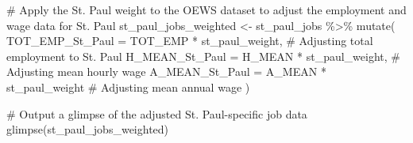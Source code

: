 \documentclass[
  letterpaper,
  DIV=11,
  numbers=noendperiod]{scrartcl}
\newenvironment{Shaded}{\begin{snugshade}}{\end{snugshade}}
\newcommand{\AttributeTok}[1]{\textcolor[rgb]{0.40,0.45,0.13}{#1}}
\newcommand{\CommentTok}[1]{\textcolor[rgb]{0.37,0.37,0.37}{#1}}
\newcommand{\FunctionTok}[1]{\textcolor[rgb]{0.28,0.35,0.67}{#1}}
\newcommand{\NormalTok}[1]{\textcolor[rgb]{0.00,0.23,0.31}{#1}}
\newcommand{\OtherTok}[1]{\textcolor[rgb]{0.00,0.23,0.31}{#1}}
\newcommand{\SpecialCharTok}[1]{\textcolor[rgb]{0.37,0.37,0.37}{#1}}
\begin{document}
\begin{Shaded}
\begin{Highlighting}[]
\CommentTok{\# Apply the St. Paul weight to the OEWS dataset to adjust the employment and wage data for St. Paul}
\NormalTok{st\_paul\_jobs\_weighted }\OtherTok{\textless{}{-}}\NormalTok{ st\_paul\_jobs }\SpecialCharTok{\%\textgreater{}\%}
  \FunctionTok{mutate}\NormalTok{(}
    \AttributeTok{TOT\_EMP\_St\_Paul =}\NormalTok{ TOT\_EMP }\SpecialCharTok{*}\NormalTok{ st\_paul\_weight,  }\CommentTok{\# Adjusting total employment to St. Paul}
    \AttributeTok{H\_MEAN\_St\_Paul =}\NormalTok{ H\_MEAN }\SpecialCharTok{*}\NormalTok{ st\_paul\_weight,    }\CommentTok{\# Adjusting mean hourly wage}
    \AttributeTok{A\_MEAN\_St\_Paul =}\NormalTok{ A\_MEAN }\SpecialCharTok{*}\NormalTok{ st\_paul\_weight     }\CommentTok{\# Adjusting mean annual wage}
\NormalTok{  )}

\CommentTok{\# Output a glimpse of the adjusted St. Paul{-}specific job data}
\FunctionTok{glimpse}\NormalTok{(st\_paul\_jobs\_weighted)}
\end{Highlighting}
\end{Shaded}
\end{document}
